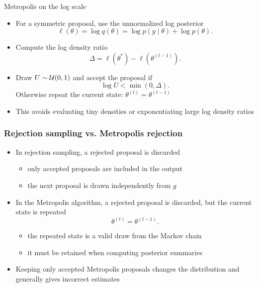 \documentclass[10pt]{beamer}
\begin{document}
\begin{frame}{Metropolis on the log scale}

  \begin{itemize}
  \item For a symmetric proposal, use the unnormalized log posterior
    \[
      \ell(\theta)=\log q(\theta)
      =\log p(y\mid\theta)+\log p(\theta).
    \]
  \pause
  \item Compute the log density ratio
    \[
      \Delta=\ell(\theta^*)-\ell(\theta^{(t-1)}).
    \]
  \pause
  \item Draw $U\sim\mathcal{U}(0,1)$ and accept the proposal if
    \[
      \log U<\min(0,\Delta).
    \]
    Otherwise repeat the current state: $\theta^{(t)}=\theta^{(t-1)}$
  \pause
  \item This avoids evaluating tiny densities or exponentiating large
    log density ratios
  \end{itemize}

\end{frame}

\begin{frame}

\frametitle{Rejection sampling vs. Metropolis rejection}

  \begin{itemize}
  \item In rejection sampling, a rejected proposal is discarded
    \begin{itemize}
    \item only accepted proposals are included in the output
    \item the next proposal is drawn independently from $g$
    \end{itemize}
  \pause
  \item In the Metropolis algorithm, a rejected proposal is discarded,
    but the current state is repeated
    \[
      \theta^{(t)}=\theta^{(t-1)}.
    \]
    \begin{itemize}
    \item the repeated state is a valid draw from the Markov chain
    \item it must be retained when computing posterior summaries
    \end{itemize}
  \pause
  \item Keeping only accepted Metropolis proposals changes the distribution
    and generally gives incorrect estimates
  \end{itemize}

\end{frame}
\end{document}

